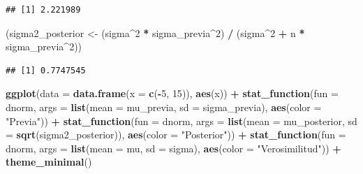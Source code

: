 \documentclass[
  12pt,
]{book}
\newenvironment{Shaded}{\begin{snugshade}}{\end{snugshade}}
\newcommand{\DataTypeTok}[1]{\textcolor[rgb]{0.13,0.29,0.53}{#1}}
\newcommand{\DecValTok}[1]{\textcolor[rgb]{0.00,0.00,0.81}{#1}}
\newcommand{\KeywordTok}[1]{\textcolor[rgb]{0.13,0.29,0.53}{\textbf{#1}}}
\newcommand{\NormalTok}[1]{#1}
\newcommand{\OperatorTok}[1]{\textcolor[rgb]{0.81,0.36,0.00}{\textbf{#1}}}
\newcommand{\StringTok}[1]{\textcolor[rgb]{0.31,0.60,0.02}{#1}}
\begin{document}
\begin{verbatim}
## [1] 2.221989
\end{verbatim}

\begin{Shaded}
\begin{Highlighting}[]
\NormalTok{(sigma2\_posterior \textless{}{-}}\StringTok{ }\NormalTok{(sigma}\OperatorTok{\^{}}\DecValTok{2} \OperatorTok{*}\StringTok{ }\NormalTok{sigma\_previa}\OperatorTok{\^{}}\DecValTok{2}\NormalTok{) }\OperatorTok{/}\StringTok{ }\NormalTok{(sigma}\OperatorTok{\^{}}\DecValTok{2} \OperatorTok{+}\StringTok{ }\NormalTok{n }\OperatorTok{*}\StringTok{ }\NormalTok{sigma\_previa}\OperatorTok{\^{}}\DecValTok{2}\NormalTok{))}
\end{Highlighting}
\end{Shaded}

\begin{verbatim}
## [1] 0.7747545
\end{verbatim}

\begin{Shaded}
\begin{Highlighting}[]
\KeywordTok{ggplot}\NormalTok{(}\DataTypeTok{data =} \KeywordTok{data.frame}\NormalTok{(}\DataTypeTok{x =} \KeywordTok{c}\NormalTok{(}\OperatorTok{{-}}\DecValTok{5}\NormalTok{, }\DecValTok{15}\NormalTok{)), }\KeywordTok{aes}\NormalTok{(x)) }\OperatorTok{+}
\StringTok{  }\KeywordTok{stat\_function}\NormalTok{(}\DataTypeTok{fun =}\NormalTok{ dnorm, }\DataTypeTok{args =} \KeywordTok{list}\NormalTok{(}\DataTypeTok{mean =}\NormalTok{ mu\_previa, }\DataTypeTok{sd =}\NormalTok{ sigma\_previa), }\KeywordTok{aes}\NormalTok{(}\DataTypeTok{color =} \StringTok{"Previa"}\NormalTok{)) }\OperatorTok{+}
\StringTok{  }\KeywordTok{stat\_function}\NormalTok{(}\DataTypeTok{fun =}\NormalTok{ dnorm, }\DataTypeTok{args =} \KeywordTok{list}\NormalTok{(}\DataTypeTok{mean =}\NormalTok{ mu\_posterior, }\DataTypeTok{sd =} \KeywordTok{sqrt}\NormalTok{(sigma2\_posterior)), }\KeywordTok{aes}\NormalTok{(}\DataTypeTok{color =} \StringTok{"Posterior"}\NormalTok{)) }\OperatorTok{+}
\StringTok{  }\KeywordTok{stat\_function}\NormalTok{(}\DataTypeTok{fun =}\NormalTok{ dnorm, }\DataTypeTok{args =} \KeywordTok{list}\NormalTok{(}\DataTypeTok{mean =}\NormalTok{ mu, }\DataTypeTok{sd =}\NormalTok{ sigma), }\KeywordTok{aes}\NormalTok{(}\DataTypeTok{color =} \StringTok{"Verosimilitud"}\NormalTok{)) }\OperatorTok{+}
\StringTok{  }\KeywordTok{theme\_minimal}\NormalTok{()}
\end{Highlighting}
\end{Shaded}
\end{document}
